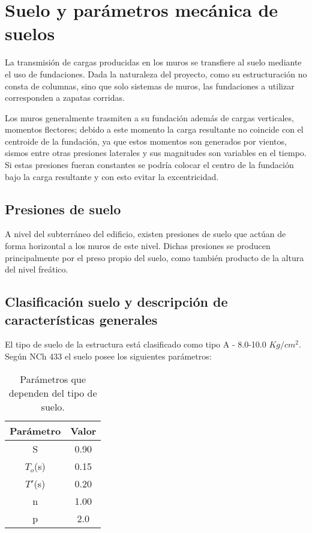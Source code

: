 \newpage
\section{Suelo y parámetros mecánica de suelos}
La transmisión de cargas producidas en los muros se transfiere al suelo mediante el uso de fundaciones. Dada la naturaleza del proyecto, como su estructuración no consta de columnas, sino que solo sistemas de muros, las fundaciones a utilizar corresponden a zapatas corridas.

Los muros generalmente trasmiten a su fundación además de cargas
verticales, momentos flectores; debido a este momento la carga resultante no coincide con el
centroide de la fundación, ya que estos momentos son generados por vientos, sismos entre
otras presiones laterales y sus magnitudes son variables en el tiempo. Si estas presiones
fueran constantes se podría colocar el centro de la fundación bajo la carga resultante y con
esto evitar la excentricidad. 

\subsection{Presiones de suelo}
A nivel del subterráneo del edificio, existen presiones de suelo que actúan de forma horizontal a los muros de este nivel. Dichas presiones se producen principalmente por el preso propio del suelo, como también producto de la altura del nivel freático.



\subsection{Clasificación suelo y descripción de características generales}

El tipo de suelo de la estructura está clasificado como tipo A - 8.0-10.0 $Kg/cm^2$. Según NCh 433 el suelo posee los siguientes parámetros:

\begin{table}[H]
  \centering
  \caption{Parámetros que dependen del tipo de suelo.}
    \begin{tabular}{|c|c|}
    \hline
    \textbf{Parámetro} & \textbf{Valor} \bigstrut\\
    \hline
    S     & 0.90 \bigstrut[t]\\
    $T_o$(s) & 0.15 \\
    $T'$(s) & 0.20 \\
    n     & 1.00 \\
    p     & 2.0 \bigstrut[b]\\
    \hline
    \end{tabular}%
  \label{tab:paramsuelo}%
\end{table}%

